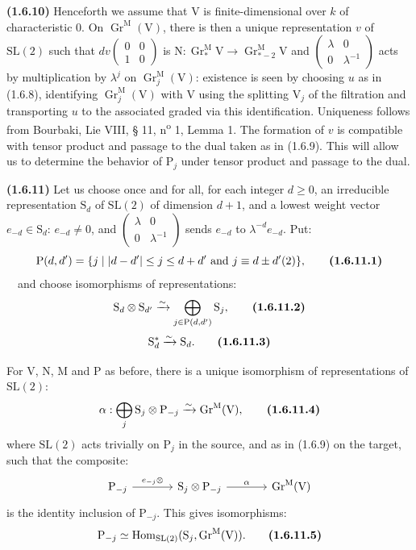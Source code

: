 \documentclass[11pt,leqno]{article}
\newcommand{\Page}[1]{\ifvmode\noindent\else\unskip\ \fi{\footnotesize\textcolor{gray}{[p.\,#1]}}\ \ignorespaces}
\begin{document}
\textbf{(1.6.10)} Henceforth we assume that \(\mathrm{V}\) is finite-dimensional over \(k\) of characteristic \(0\). On \(\operatorname{Gr}^{\mathrm{M}}(\mathrm{V})\), there is then a unique representation \(v\) of \(\mathrm{SL}(2)\) such that \(dv\begin{pmatrix}0&0\\1&0\end{pmatrix}\) is \(\mathrm{N}:\operatorname{Gr}_*^{\mathrm{M}}\mathrm{V}\to\operatorname{Gr}_{*-2}^{\mathrm{M}}\mathrm{V}\) and \(\begin{pmatrix}\lambda&0\\0&\lambda^{-1}\end{pmatrix}\) acts by multiplication by \(\lambda^j\) on \(\operatorname{Gr}_j^{\mathrm{M}}(\mathrm{V})\): existence is seen by choosing \(u\) as in (1.6.8), identifying \(\operatorname{Gr}_j^{\mathrm{M}}(\mathrm{V})\) with \(\mathrm{V}\) using the splitting \(\mathrm{V}_j\) of the filtration and transporting \(u\) to the associated graded via this identification. Uniqueness follows from Bourbaki, Lie VIII, § 11, n\textsuperscript{o} 1, Lemma 1. The formation of \(v\) is compatible with tensor product and passage to the dual taken as in (1.6.9). This will allow us to determine the behavior of \(\mathrm{P}_j\) under tensor product and passage to the dual.

\textbf{(1.6.11)} Let us choose once and for all, for each integer \(d\ge0\), an irreducible representation \(\mathrm{S}_d\) of \(\mathrm{SL}(2)\) of dimension \(d+1\), and a lowest weight vector \(e_{-d}\in\mathrm{S}_d\): \(e_{-d}\ne0\), and \(\begin{pmatrix}\lambda&0\\0&\lambda^{-1}\end{pmatrix}\) sends \(e_{-d}\) to \(\lambda^{-d}e_{-d}\). Put:
\[
\mathrm{P}(d,d')=\{j\mid |d-d'|\le j\le d+d'\text{ and }j\equiv d\pm d'(2)\},
\tag*{\textbf{(1.6.11.1)}}
\]
\Page{168}and choose isomorphisms of representations:
\[
\mathrm{S}_d\otimes\mathrm{S}_{d'}
\xrightarrow{\sim}
\bigoplus_{j\in\mathrm{P}(d,d')}\mathrm{S}_j,
\tag*{\textbf{(1.6.11.2)}}
\]
\[
\mathrm{S}_d^*\xrightarrow{\sim}\mathrm{S}_d.
\tag*{\textbf{(1.6.11.3)}}
\]

For \(\mathrm{V}\), \(\mathrm{N}\), \(\mathrm{M}\) and \(\mathrm{P}\) as before, there is a unique isomorphism of representations of \(\mathrm{SL}(2)\):
\[
\alpha:\bigoplus_j\mathrm{S}_j\otimes\mathrm{P}_{-j}
\xrightarrow{\sim}\operatorname{Gr}^{\mathrm{M}}(\mathrm{V}),
\tag*{\textbf{(1.6.11.4)}}
\]
where \(\mathrm{SL}(2)\) acts trivially on \(\mathrm{P}_j\) in the source, and as in (1.6.9) on the target, such that the composite:
\[
\begin{tikzcd}[ampersand replacement=\&,column sep=large]
\mathrm{P}_{-j}
  \arrow[r,"{e_{-j}\otimes}"]
  \& \mathrm{S}_j\otimes\mathrm{P}_{-j}
  \arrow[r,"\alpha"]
  \& \operatorname{Gr}^{\mathrm{M}}(\mathrm{V})
\end{tikzcd}
\]
is the identity inclusion of \(\mathrm{P}_{-j}\). This gives isomorphisms:
\[
\mathrm{P}_{-j}\simeq
\operatorname{Hom}_{\mathrm{SL}(2)}
(\mathrm{S}_j,\operatorname{Gr}^{\mathrm{M}}(\mathrm{V})).
\tag*{\textbf{(1.6.11.5)}}
\]
\end{document}
